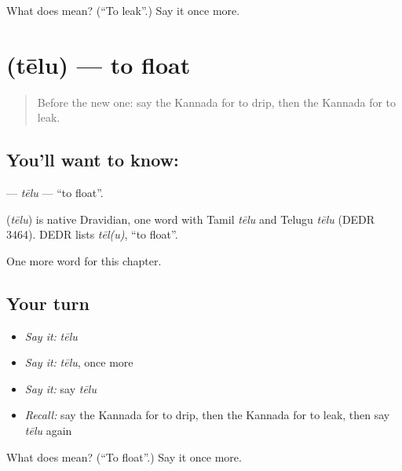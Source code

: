 \begin{tcolorbox}[breakable,colback=teal!4,colframe=teal!35!black,title={Before you move on}]
What does  mean? (\textquotedblleft{}To leak\textquotedblright{}.) Say it once more.
\end{tcolorbox}
\section[\texorpdfstring{\kn{ತೇಲು} (tēlu)}{ತೇಲು (tēlu)}]{ (tēlu) — to float}

\label{lesson:KA-C166-telu}



\begin{quote}
Before the new one: say the Kannada for to drip, then the Kannada for to leak.
\end{quote}

\subsection*{You'll want to know: }
\textbf{} — \emph{tēlu} — \textquotedblleft{}to float\textquotedblright{}.

\begin{cousinweb}
\textbf{} (\emph{tēlu}) is native Dravidian, one word with Tamil \emph{tēlu} and Telugu \emph{tēlu} (DEDR 3464). DEDR lists \emph{tēl(u)}, \textquotedblleft{}to float\textquotedblright{}.
\end{cousinweb}

\begin{grammarlens}[title={What you've built}]
One more word for this chapter.
\end{grammarlens}

\subsection*{Your turn}
\begin{itemize}
\raggedright
  \item \emph{Say it:} \emph{tēlu}
  \item \emph{Say it:} \emph{tēlu}, once more
  \item \emph{Say it:} say \emph{tēlu}
  \item \emph{Recall:} say the Kannada for to drip, then the Kannada for to leak, then say \emph{tēlu} again
\end{itemize}

\begin{tcolorbox}[breakable,colback=teal!4,colframe=teal!35!black,title={Before you move on}]
What does  mean? (\textquotedblleft{}To float\textquotedblright{}.) Say it once more.
\end{tcolorbox}
